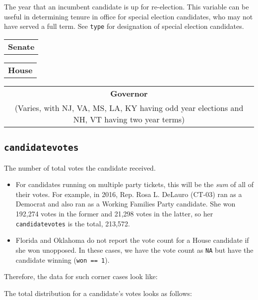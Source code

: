 \documentclass[12pt]{article}
\begin{document}
The year that an incumbent candidate is up for re-election. This variable can be useful in determining tenure in office for special election candidates, who may not have served a full term. See \texttt{type} for designation of special election candidates.

\begin{tabularx}{\linewidth}{C}
\textbf{Senate}\\

\end{tabularx}

\begin{tabularx}{\linewidth}{C}
\textbf{House}\\

\end{tabularx}

\begin{tabularx}{\linewidth}{C}
\textbf{Governor}\\
(Varies, with NJ, VA, MS, LA, KY having odd year elections and NH, VT having two year terms)
\end{tabularx}

\FloatBarrier

\subsection*{\texttt{candidatevotes}}

The number of total votes the candidate received.
\begin{itemize}
\item For candidates running on multiple party tickets, this will be the \emph{sum} of all of their votes.  For example, in 2016, Rep. Rosa L. DeLauro (CT-03) ran as a Democrat and also ran as a Working Families Party candidate. She won 192,274 votes in the former and 21,298 votes in the latter, so her \texttt{candidatevotes} is the total, 213,572.
\item  Florida and Oklahoma do not report the vote count for a House candidate if she won unopposed. In these cases, we have the vote count as \texttt{NA} but have the candidate winning (\texttt{won == 1}).
\end{itemize}

Therefore, the data for such corner cases look like:

\begin{table}[!h]
\centering
\footnotesize

\end{table}


The total distribution for a candidate's votes looks as follows:
\end{document}
